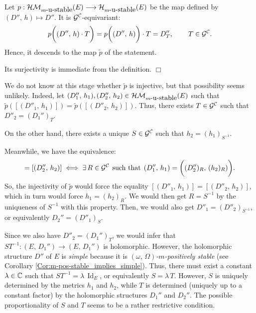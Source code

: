 \documentclass[12pt]{article}
\begin{document}
 Let $p:{\cal HM}_{m\mbox{-u-stable}}(E)\longrightarrow{\cal H}_{m\mbox{-u-stable}}(E)$ be the map defined by $(D'',\,h)\mapsto D''$. It is ${\cal G}^{\cal C}$-equivariant: \begin{eqnarray*}p\bigg((D'',\,h)\cdot T\bigg) = p\bigg((D'',\,h)\bigg)\cdot T = D''_T,  \hspace{5ex} T\in{\cal G}^{\cal C}.\end{eqnarray*} Hence, it descends to the map $\widetilde{p}$ of the statement.

Its surjectivity is immediate from the definition. \hfill $\Box$

\vspace{2ex}

We do not know at this stage whether $\widetilde{p}$ is injective, but that possibility seems unlikely. Indeed, let $(D''_1,\,h_1), (D''_2,\,h_2)\in{\cal HM}_{m\mbox{-u-stable}}(E)$ such that $\widetilde{p}([(D''_1,\,h_1)]) = \widetilde{p}([(D''_2,\,h_2)])$. Thus, there exists $T\in{\cal G}^{\cal C}$ such that $D''_2 = (D_1'')_T$.

On the other hand, there exists a unique $S\in{\cal G}^{\cal C}$ such that $h_2 = (h_1)_{S^{-1}}$.

Meanwhile, we have the equivalence: \begin{eqnarray*}[(D''_1,\,h_1)] = [(D''_2,\,h_2)] \iff \exists\,R\in{\cal G}^{\cal C} \hspace{1ex}\mbox{such that}\hspace{1ex} (D''_1,\,h_1) = \bigg((D''_2)_R,\,(h_2)_R)  \bigg).\end{eqnarray*} So, the injectivity of $\widetilde{p}$ would force the equality $[(D''_1,\,h_1)] = [(D''_2,\,h_2)]$, which in turn would force $h_1 = (h_2)_R$. We would then get $R = S^{-1}$ by the uniqueness of $S^{-1}$ with this property. Then, we would also get $D''_1 = (D''_2)_{S^{-1}}$, or equivalently $D_2'' = (D''_1)_S$.

Since we also have $D''_2 = (D_1'')_T$, we would infer that $ST^{-1} : (E,\,D_1'')\longrightarrow(E,\,D_1'')$ is holomorphic. However, the holomorphic structure $D''$ of $E$ is {\it simple} because it is {\it $(\omega,\,\Omega)$-$m$-positively stable} (see Corollary \ref{Cor:m-pos-stable_implies_simple}). Thus, there must exist a constant $\lambda\in\mathbb{C}$ such that $ST^{-1} = \lambda\,\operatorname{Id}_E$, or equivalently $S = \lambda\, T$. However, $S$ is uniquely determined by the metrics $h_1$ and $h_2$, while $T$ is determined (uniquely up to a constant factor) by the holomorphic structures $D_1''$ and $D_2''$. The possible proportionality of $S$ and $T$ seems to be a rather restrictive condition.  
\end{document}
